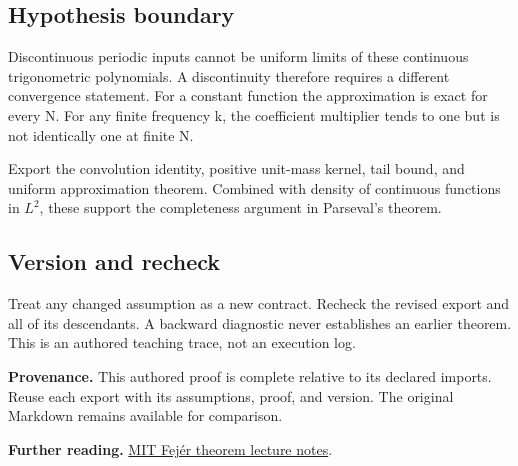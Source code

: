 \documentclass[preprint,12pt,aps,pra,showkeys,amsmath,amssymb,superscriptaddress,floatfix]{revtex4-2}
\theoremstyle{definition}
\theoremstyle{remark}
\begin{document}
\subsection{Hypothesis boundary}
Discontinuous periodic inputs cannot be uniform limits of these
continuous trigonometric polynomials. A discontinuity therefore requires
a different convergence statement. For a constant function the
approximation is exact for every N. For any finite frequency k, the
coefficient multiplier tends to one but is not identically one at finite
N.

Export the convolution identity, positive unit-mass kernel, tail bound,
and uniform approximation theorem. Combined with density of continuous
functions in \(L^{2}\), these support the completeness argument in
Parseval's theorem.

\subsection{Version and recheck}
Treat any changed assumption as a new contract. Recheck the revised
export and all of its descendants. A backward diagnostic never
establishes an earlier theorem. This is an authored teaching trace, not
an execution log.

\par\medskip\begingroup\small\linespread{1.0}\selectfont\noindent\textbf{Provenance.} This authored proof is complete relative to its declared imports. Reuse
each export with its assumptions, proof, and version. The original
Markdown remains available for comparison.
\par\endgroup

\par\smallskip\begingroup\small\linespread{1.0}\selectfont\noindent\textbf{Further reading.} \href{https://ocw.mit.edu/courses/18-102-introduction-to-functional-analysis-spring-2021/eb44436072623f60f8f416875d4b2c11_MIT18_102s21_lec16.pdf}{MIT
Fejér theorem lecture notes}.\par\endgroup
\end{document}
